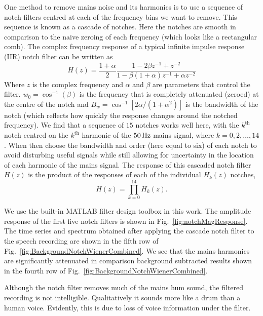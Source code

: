 \documentclass[paper-main.tex]{subfiles}
\begin{document}
One method to remove mains noise and its harmonics is to use a sequence of notch filters centred at each of the frequency bins we want to remove. This sequence is known as a cascade of notches. Here the notches are smooth in comparison to the naive zeroing of each frequency (which looks like a rectangular comb). The complex frequency response of a typical infinite impulse response (IIR) notch filter can be written as \citep{10.5555/541204}
\begin{equation}
    \label{eqn:notch}
    H(z)=\frac{1+\alpha}{2}\frac{1-2\beta z^{-1}+z^{-2}}{1-\beta(1+\alpha)z^{-1}+\alpha z^{-2}}
\end{equation}
Where $z$ is the complex frequency and $\alpha$ and $\beta$ are parameters that control the filter. $w_0=\cos^{-1}(\beta)$ is the frequency that is completely attenuated (zeroed) at the centre of the notch and $B_w=\cos^{-1}[2\alpha/(1+\alpha^2)]$ is the bandwidth of the notch (which reflects how quickly the response changes around the notched frequency).
We find that a sequence of $15$ notches works well here, with the $k^\mathrm{th}$ notch centred on the $k^\mathrm{th}$ harmonic of the $50\,{\rm Hz}$ mains signal, where $k=0,2,\dots,14$. When then choose the bandwidth and order (here equal to six) of each notch to avoid disturbing useful signals while still allowing for uncertainty in the location of each harmonic of the mains signal. The response of this cascaded notch filter $H(z)$ is the product of the responses of each of the individual $H_k(z)$ notches,
\begin{equation}
    \label{eqn:notch15}
    H(z) = \prod_{k=0}^{14} H_k(z).
\end{equation}

We use the built-in MATLAB filter design toolbox in this work. 
The amplitude response of the first five notch filters is shown in Fig.~\ref{fig:notchMagResponse}. 
The time series and spectrum obtained after applying the cascade notch filter to the speech recording are shown in the fifth row of Fig.~\ref{fig:BackgroundNotchWienerCombined}.
We see that the mains harmonics are significantly attenuated in comparison background subtracted results shown in the fourth row of Fig.~\ref{fig:BackgroundNotchWienerCombined}.

Although the notch filter removes much of the mains hum sound, the filtered recording is not intelligible. Qualitatively it sounds more like a drum than a human voice. Evidently, this is due to loss of voice information under the filter.
\end{document}
